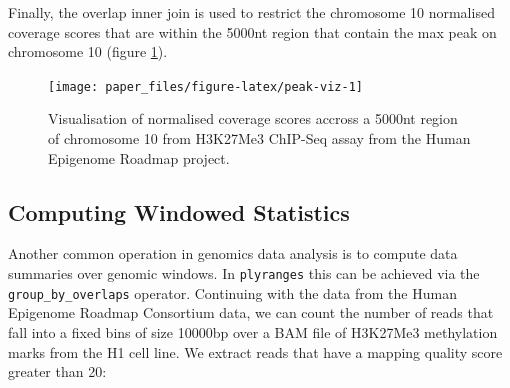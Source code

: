 \documentclass[10pt,letterpaper]{article}
\newenvironment{Shaded}{\begin{snugshade}}{\end{snugshade}}
\newcommand{\DataTypeTok}[1]{\textcolor[rgb]{0.13,0.29,0.53}{#1}}
\newcommand{\DecValTok}[1]{\textcolor[rgb]{0.00,0.00,0.81}{#1}}
\newcommand{\KeywordTok}[1]{\textcolor[rgb]{0.13,0.29,0.53}{\textbf{#1}}}
\newcommand{\NormalTok}[1]{#1}
\newcommand{\OperatorTok}[1]{\textcolor[rgb]{0.81,0.36,0.00}{\textbf{#1}}}
\newcommand{\StringTok}[1]{\textcolor[rgb]{0.31,0.60,0.02}{#1}}
\begin{document}
\begin{Shaded}
\end{Shaded}

Finally, the overlap inner join is used to restrict the chromosome 10
normalised coverage scores that are within the 5000nt region that
contain the max peak on chromosome 10 (figure \ref{fig:peak-viz}).

\begin{Shaded}
\end{Shaded}

\begin{figure}

{\centering \texttt{[image: paper\_files/figure-latex/peak-viz-1]} 

}

\caption{Visualisation of normalised coverage scores accross a 5000nt region of chromosome 10 from H3K27Me3 ChIP-Seq assay from the Human Epigenome Roadmap project.}\label{fig:peak-viz}
\end{figure}

\hypertarget{computing-windowed-statistics}{%
\subsection{Computing Windowed
Statistics}\label{computing-windowed-statistics}}

Another common operation in genomics data analysis is to compute data
summaries over genomic windows. In \texttt{plyranges} this can be
achieved via the \texttt{group\_by\_overlaps} operator. Continuing with
the data from the Human Epigenome Roadmap Consortium data, we can count
the number of reads that fall into a fixed bins of size 10000bp over a
BAM file of H3K27Me3 methylation marks from the H1 cell line. We extract
reads that have a mapping quality score greater than 20:
\end{document}
